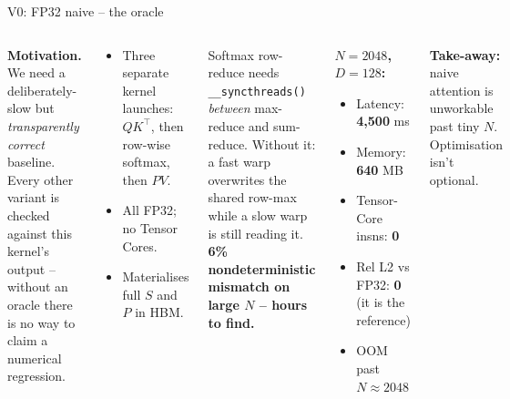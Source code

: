 \documentclass[10pt,aspectratio=169]{beamer}
\begin{document}
\begin{frame}{V0: FP32 naive -- the oracle}
  \begin{columns}[T]
      \textbf{Motivation.} We need a deliberately-slow but
      \emph{transparently correct} baseline. Every other variant is
      checked against this kernel's output -- without an oracle there
      is no way to claim a numerical regression.
      \vspace{0.4em}
      \begin{whatif}
        \begin{itemize}
          \item Three separate kernel launches: $Q K^\top$, then
                row-wise softmax, then $P V$.
          \item All FP32; no Tensor Cores.
          \item Materialises full $S$ and $P$ in HBM.
        \end{itemize}
      \end{whatif}
      \begin{whatbroke}
        Softmax row-reduce needs \texttt{\_\_syncthreads()}
        \emph{between} max-reduce and sum-reduce. Without it: a fast
        warp overwrites the shared row-max while a slow warp is still
        reading it. \textbf{6\% nondeterministic mismatch on large
        $N$ -- hours to find.}
      \end{whatbroke}
      \begin{numbers}
        \textbf{$N = 2048$, $D = 128$:}
        \begin{itemize}
          \item Latency: \textbf{4{,}500} ms
          \item Memory: \textbf{640} MB
          \item Tensor-Core insns: \textbf{0}
          \item Rel L2 vs FP32: \textbf{0} (it is the reference)
          \item OOM past $N \approx 2048$
        \end{itemize}
      \end{numbers}
      \begin{aha}
        \textbf{Take-away:} naive attention is unworkable past tiny
        $N$. Optimisation isn't optional.
      \end{aha}
  \end{columns}
\end{frame}
\end{document}
